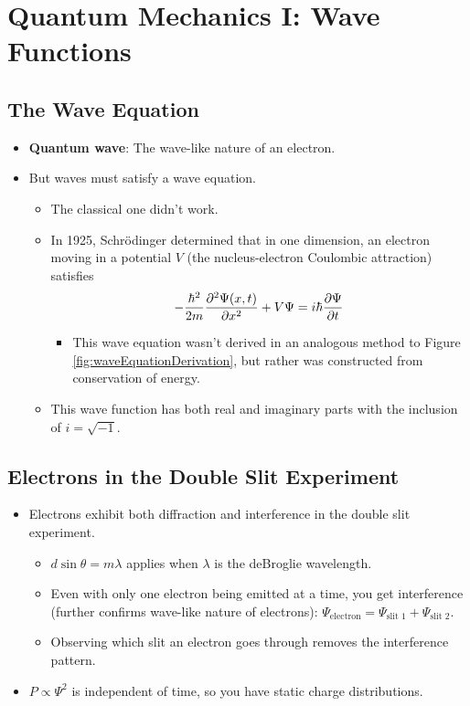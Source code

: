 \documentclass[../notes.tex]{subfiles}
\begin{document}
\chapter{Quantum Mechanics I: Wave Functions}
\section{The Wave Equation}
\begin{itemize}
    \item {}\textbf{Quantum wave}: The wave-like nature of an electron.
    \item But waves must satisfy a wave equation.
    \begin{itemize}
        \item The classical one didn't work.
        \item In 1925, Schr\"{o}dinger determined that in one dimension, an electron moving in a potential $V$ (the nucleus-electron Coulombic attraction) satisfies
        \begin{equation*}
            -\frac{\hbar^2}{2m}\pdv[2]{\Psi(x,t)}{x}+V\Psi = i\hbar\pdv{\Psi}{t}
        \end{equation*}
        \begin{itemize}
            \item This wave equation wasn't derived in an analogous method to Figure \ref{fig:waveEquationDerivation}, but rather was constructed from conservation of energy.
        \end{itemize}
        \item This wave function has both real and imaginary parts with the inclusion of $i=\sqrt{-1}$.
    \end{itemize}
\end{itemize}



\section{Electrons in the Double Slit Experiment}
\begin{itemize}
    \item Electrons exhibit both diffraction and interference in the double slit experiment.
    \begin{itemize}
        \item $d\sin\theta=m\lambda$ applies when $\lambda$ is the deBroglie wavelength.
        \item Even with only one electron being emitted at a time, you get interference (further confirms wave-like nature of electrons): $\Psi_\text{electron}=\Psi_\text{slit 1}+\Psi_\text{slit 2}$.
        \item Observing which slit an electron goes through removes the interference pattern.
    \end{itemize}
    \item $P\propto\Psi^2$ is independent of time, so you have static charge distributions.
\end{itemize}
\end{document}
